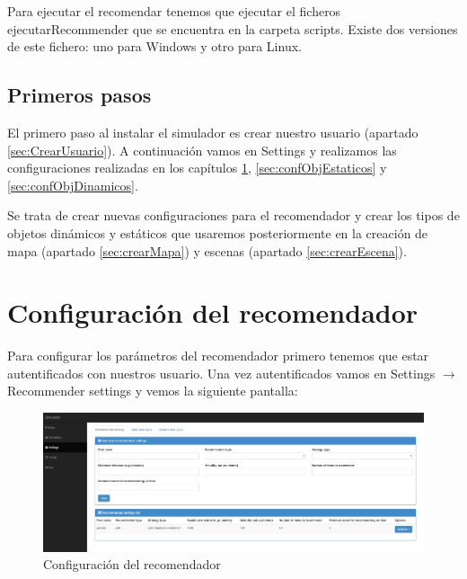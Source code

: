 Para ejecutar el recomendar tenemos que ejecutar el ficheros ejecutarRecommender que se encuentra en la carpeta scripts. Existe dos versiones de este fichero: uno para Windows y otro para Linux.

\subsection{Primeros pasos}

El primero paso al instalar el simulador es crear nuestro usuario (apartado \ref{sec:CrearUsuario}). A continuación vamos en Settings y realizamos las configuraciones realizadas en los capítulos \ref{sec:confRecomendador}, \ref{sec:confObjEstaticos} y \ref*{sec:confObjDinamicos}.

Se trata de crear nuevas configuraciones para el recomendador y crear los tipos de objetos dinámicos y estáticos que usaremos posteriormente en la creación de mapa (apartado \ref{sec:crearMapa}) y escenas (apartado \ref{sec:crearEscena}).

\section{Configuración del recomendador}\label{sec:confRecomendador}

Para configurar los parámetros del recomendador primero tenemos que estar autentificados con nuestros usuario. Una vez autentificados vamos en Settings $\rightarrow$ Recommender settings y vemos la siguiente pantalla:

\begin{figure}[H]
	\centering\includegraphics[scale=0.25]{imagenes/capitulo2/configuracion-recomendador.jpg}
	\caption{Configuración del recomendador}
	\label{img:ConfiguracionRecomendador}
\end{figure}



